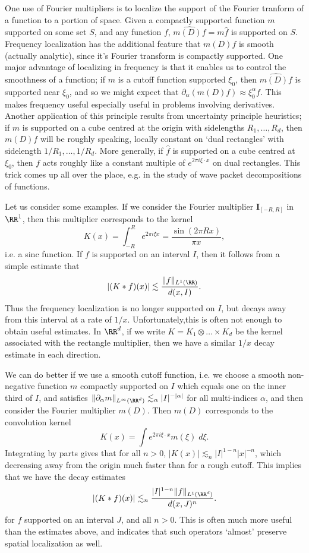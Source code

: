 One use of Fourier multipliers is to localize the support of the Fourier tranform of a function to a portion of space. Given a compactly supported function $m$ supported on some set $S$, and any function $f$, $\widehat{m(D) f} = m \widehat{f}$ is supported on $S$. Frequency localization has the additional feature that $m(D) f$ is smooth (actually analytic), since it's Fourier transform is compactly supported. One major advantage of localizing in frequency is that it enables us to control the smoothness of a function; if $m$ is a cutoff function supported $\xi_0$, then $\widehat{m(D) f}$ is supported near $\xi_0$, and so we might expect that $\partial_\alpha (m(D) f) \approx \xi_0^\alpha f$. This makes frequency useful especially useful in problems involving derivatives. Another application of this principle results from uncertainty principle heuristics; if $m$ is supported on a cube centred at the origin with sidelengths $R_1,\dots,R_d$, then $m(D) f$ will be roughly speaking, locally constant on `dual rectangles' with sidelength $1/R_1, \dots, 1/R_d$. More generally, if $\widehat{f}$ is supported on a cube centred at $\xi_0$, then $f$ acts roughly like a constant multiple of $e^{2 \pi i \xi \cdot x}$ on dual rectangles. This trick comes up all over the place, e.g. in the study of wave packet decompositions of functions.

Let us consider some examples. If we consider the Fourier multiplier $\mathbf{I}_{[-R,R]}$ in $\RR^1$, then this multiplier corresponds to the kernel
%
\[ K(x) = \int_{-R}^R e^{2 \pi i \xi x} = \frac{\sin(2 \pi R x)}{\pi x}, \]
%
i.e. a sinc function. If $f$ is supported on an interval $I$, then it follows from a simple estimate that
%
\[ |(K * f)(x)| \lesssim \frac{\| f \|_{L^1(\RR)}}{d(x,I)}. \]
%
Thus the frequency localization is no longer supported on $I$, but decays away from this interval at a rate of $1/x$. Unfortunately,this is often not enough to obtain useful estimates. In $\RR^d$, if we write $K = K_1 \otimes \dots \times K_d$ be the kernel associated with the rectangle multiplier, then we have a similar $1/x$ decay estimate in each direction.

We can do better if we use a smooth cutoff function, i.e. we choose a smooth non-negative function $m$ compactly supported on $I$ which equals one on the inner third of $I$, and satisfies $\| \partial_\alpha m \|_{L^\infty(\RR^d)} \lesssim_\alpha |I|^{-|\alpha|}$ for all multi-indices $\alpha$, and then consider the Fourier multiplier $m(D)$. Then $m(D)$ corresponds to the convolution kernel
%
\[ K(x) = \int e^{2 \pi i \xi \cdot x} m(\xi)\; d\xi. \]
%
Integrating by parts gives that for all $n > 0$, $|K(x)| \lesssim_n |I|^{1-n} |x|^{-n}$, which decreasing away from the origin much faster than for a rough cutoff. This implies that we have the decay estimates
%
\[ |(K * f)(x)| \lesssim_n \frac{|I|^{1-n} \| f \|_{L^1(\RR^d)}}{d(x,J)^n}. \]
%
for $f$ supported on an interval $J$, and all $n > 0$. This is often much more useful than the estimates above, and indicates that such operators `almost' preserve spatial localization as well.









